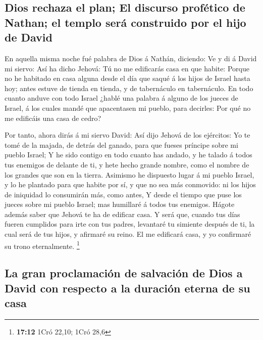 \hypertarget{dios-rechaza-el-plan-el-discurso-profuxe9tico-de-nathan-el-templo-seruxe1-construido-por-el-hijo-de-david}{%
\subsection{Dios rechaza el plan; El discurso profético de Nathan; el
templo será construido por el hijo de
David}\label{dios-rechaza-el-plan-el-discurso-profuxe9tico-de-nathan-el-templo-seruxe1-construido-por-el-hijo-de-david}}

 En aquella misma noche fué palabra de Dios á Nathán,
diciendo:  Ve y di á David mi siervo: Así ha dicho Jehová:
Tú no me edificarás casa en que habite:  Porque no he
habitado en casa alguna desde el día que saqué á los hijos de Israel
hasta hoy; antes estuve de tienda en tienda, y de tabernáculo en
tabernáculo.  En todo cuanto anduve con todo Israel ¿hablé
una palabra á alguno de los jueces de Israel, á los cuales mandé que
apacentasen mi pueblo, para decirles: Por qué no me edificáis una casa
de cedro?

 Por tanto, ahora dirás á mi siervo David: Así dijo Jehová
de los ejércitos: Yo te tomé de la majada, de detrás del ganado, para
que fueses príncipe sobre mi pueblo Israel;  Y he sido
contigo en todo cuanto has andado, y he talado á todos tus enemigos de
delante de ti, y hete hecho grande nombre, como el nombre de los grandes
que son en la tierra.  Asimismo he dispuesto lugar á mi
pueblo Israel, y lo he plantado para que habite por sí, y que no sea más
conmovido: ni los hijos de iniquidad lo consumirán más, como antes,
 Y desde el tiempo que puse los jueces sobre mi pueblo
Israel; mas humillaré á todos tus enemigos. Hágote además saber que
Jehová te ha de edificar casa.  Y será que, cuando tus días
fueren cumplidos para irte con tus padres, levantaré tu simiente después
de ti, la cual será de tus hijos, y afirmaré su reino.  El
me edificará casa, y yo confirmaré su trono eternalmente. \footnote{\textbf{17:12}
  1Cró 22,10; 1Cró 28,6}

\hypertarget{la-gran-proclamaciuxf3n-de-salvaciuxf3n-de-dios-a-david-con-respecto-a-la-duraciuxf3n-eterna-de-su-casa}{%
\subsection{La gran proclamación de salvación de Dios a David con
respecto a la duración eterna de su
casa}\label{la-gran-proclamaciuxf3n-de-salvaciuxf3n-de-dios-a-david-con-respecto-a-la-duraciuxf3n-eterna-de-su-casa}}

